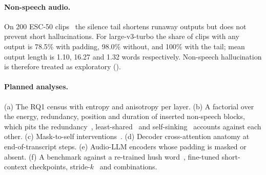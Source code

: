 \paragraph{Non-speech audio.} On 200 ESC-50 clips~\cite{piczak2015esc} the silence tail shortens runaway outputs but does not prevent short hallucinations. For large-v3-turbo the share of clips with any output is 78.5\% with padding, 98.0\% without, and 100\% with the tail; mean output length is 1.10, 16.27 and 1.32 words respectively. Non-speech hallucination is therefore treated as exploratory ().

\paragraph{Planned analyses.} (a) The RQ1 census with entropy and anisotropy per layer. (b) A factorial over the energy, redundancy, position and duration of inserted non-speech blocks, which pits the redundancy~\cite{darcet2024registers}, least-shared~\cite{ngnawe2026spike} and self-sinking~\cite{sun2026anatomy,li2026structural} accounts against each other. (c) Mask-to-self interventions~\cite{li2026structural}. (d) Decoder cross-attention anatomy at end-of-transcript steps. (e) Audio-LLM encoders whose padding is masked or absent. (f) A benchmark against a re-trained hush word~\cite{wang2024whisperflow}, fine-tuned short-context checkpoints, stride-$k$~\cite{cho2026stridek} and combinations.

